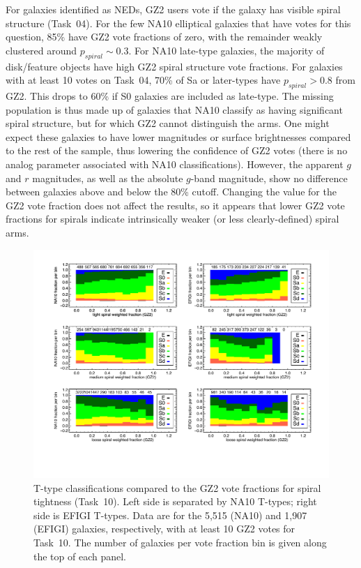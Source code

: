 \documentclass[useAMS,usenatbib]{mn2e}
\providecommand{\DIFaddtex}[1]{{\protect\color{blue}\uwave{#1}}} %
\providecommand{\DIFdeltex}[1]{{\protect\color{red}\sout{#1}}}                      %
\providecommand{\DIFaddbegin}{} %
\providecommand{\DIFaddend}{} %
\providecommand{\DIFdelbegin}{} %
\providecommand{\DIFdelend}{} %
\providecommand{\DIFadd}[1]{\texorpdfstring{\DIFaddtex{#1}}{#1}} %
\providecommand{\DIFdel}[1]{\texorpdfstring{\DIFdeltex{#1}}{}} %
\begin{document}
For galaxies identified as NEDs, GZ2 users vote if the galaxy has visible spiral structure (Task~04). For the few NA10 elliptical galaxies that have votes for this question, 85\% have GZ2 vote fractions of zero, with the remainder weakly clustered around \DIFdelbegin \DIFdel{$p_{spiral}\sim0.3$}\DIFdelend \DIFaddbegin \DIFadd{$p_\mathrm{spiral}\sim0.3$}\DIFaddend . For NA10 late-type galaxies, the majority of disk/feature objects have high GZ2 spiral structure vote fractions. For galaxies with at least 10 votes on Task~04, 70\% of Sa or later-types have \DIFdelbegin \DIFdel{$p_{spiral}>0.8$ }\DIFdelend \DIFaddbegin \DIFadd{$p_\mathrm{spiral}>0.8$ }\DIFaddend from GZ2. This drops to 60\% if S0 galaxies are included as late-type. The missing population is thus made up of galaxies that NA10 classify as having significant spiral structure, but for which GZ2 cannot distinguish the arms. One might expect these galaxies to have lower magnitudes or surface brightnesses compared to the rest of the sample, thus lowering the confidence of GZ2 votes (there is no analog parameter associated with NA10 classifications). However, the apparent $g$ and $r$ magnitudes, as well as the absolute $g$-band magnitude, show no difference between galaxies above and below the 80\% cutoff. Changing the value for the GZ2 vote fraction does not affect the results, so it appears that lower GZ2 vote fractions for spirals indicate intrinsically weaker (or less clearly-defined) spiral arms.

\begin{figure}
\includegraphics[angle=0,width=7.0in]{figures/spiraltightness_color.pdf}
\caption{T-type classifications compared to the GZ2 vote fractions for spiral tightness (Task~10). Left side is separated by NA10 T-types; right side is EFIGI T-types. Data are for the 5,515 (NA10) and 1,907 (EFIGI) galaxies, respectively, with at least 10 GZ2 votes for Task~10. The number of galaxies per vote fraction bin is given along the top of each panel. 
\label{fig-spiraltightness}}
\end{figure}
\end{document}
